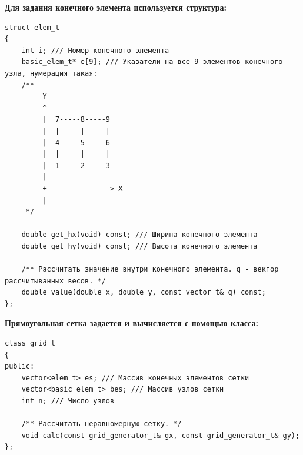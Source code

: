 \noindent\textbf{Для задания конечного элемента используется структура:}

\begin{tcolorbox}[
	colback=white,
	colframe=black!30!white,
	boxrule=0.5pt, 
	listing only,
	left=-0.5mm,
	leftrule=4mm,
	arc=2mm, outer arc=2mm,
	top=0pt,
	bottom=0pt,
	enhanced jigsaw,
	coltitle=black, 
	fonttitle=\bfseries\ttfamily,
	break at=-\baselineskip/0pt/\textheight, 
]
\begin{verbatim}
struct elem_t
{
    int i; /// Номер конечного элемента
    basic_elem_t* e[9]; /// Указатели на все 9 элементов конечного узла, нумерация такая:
    /** 
         Y
         ^
         |  7-----8-----9
         |  |     |     |
         |  4-----5-----6
         |  |     |     |
         |  1-----2-----3
         |
        -+---------------> X
         |
     */

    double get_hx(void) const; /// Ширина конечного элемента
    double get_hy(void) const; /// Высота конечного элемента

    /** Рассчитать значение внутри конечного элемента. q - вектор рассчитыванных весов. */
    double value(double x, double y, const vector_t& q) const;
};
\end{verbatim}
\end{tcolorbox} 

\noindent\textbf{Прямоугольная сетка задается и вычисляется с помощью класса:}

\begin{tcolorbox}[
	colback=white,
	colframe=black!30!white,
	boxrule=0.5pt, 
	listing only,
	left=-0.5mm,
	leftrule=4mm,
	arc=2mm, outer arc=2mm,
	top=0pt,
	bottom=0pt,
	enhanced jigsaw,
	coltitle=black, 
	fonttitle=\bfseries\ttfamily,
	break at=-\baselineskip/0pt/\textheight, 
]
\begin{verbatim}
class grid_t
{
public:
    vector<elem_t> es; /// Массив конечных элементов сетки
    vector<basic_elem_t> bes; /// Массив узлов сетки
    int n; /// Число узлов

    /** Рассчитать неравномерную сетку. */
    void calc(const grid_generator_t& gx, const grid_generator_t& gy);
};
\end{verbatim}
\end{tcolorbox} 

